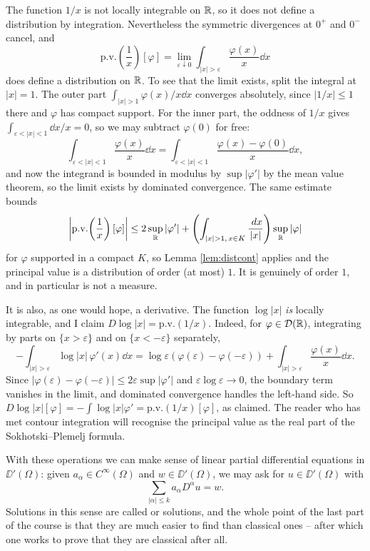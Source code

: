 \documentclass[a4paper]{scrartcl}
\begin{document}
\begin{example}\label{ex:pv}
	The function $1/x$ is not locally integrable on $\mathbb{R}$, so it does not define a distribution by integration. Nevertheless the symmetric divergences at $0^+$ and $0^-$ cancel, and
	$$\mathrm{p.v.}\!\left(\frac 1x\right)[\varphi]=\lim_{\varepsilon\downarrow0}\int_{|x|>\varepsilon}\frac{\varphi(x)}{x}\dd x$$
	does define a distribution on $\mathbb{R}$. To see that the limit exists, split the integral at $|x|=1$. The outer part $\int_{|x|>1}\varphi(x)/x\dd x$ converges absolutely, since $|1/x|\le1$ there and $\varphi$ has compact support. For the inner part, the oddness of $1/x$ gives $\int_{\varepsilon<|x|<1}\dd x/x = 0$, so we may subtract $\varphi(0)$ for free:
	$$\int_{\varepsilon<|x|<1}\frac{\varphi(x)}{x}\dd x = \int_{\varepsilon<|x|<1}\frac{\varphi(x)-\varphi(0)}{x}\dd x,$$
	and now the integrand is bounded in modulus by $\sup|\varphi'|$ by the mean value theorem, so the limit exists by dominated convergence. The same estimate bounds
	$$\left| \mathrm{p.v.}\!\left(\frac 1x\right)[\varphi]\right|\le 2\sup_\R|\varphi'| + \left(\int_{|x|>1, \, x \in K}\frac{\dd x}{|x|}\right)\sup_\R|\varphi|$$
	for $\varphi$ supported in a compact $K$, so Lemma \ref{lem:distcont} applies and the principal value is a distribution of order (at most) $1$. It is genuinely of order $1$, and in particular is not a measure.

	It is also, as one would hope, a derivative. The function $\log|x|$ \emph{is} locally integrable, and I claim $D\log|x| = \mathrm{p.v.}(1/x)$. Indeed, for $\varphi \in \mathcal{D}(\mathbb{R})$, integrating by parts on $\{x>\varepsilon\}$ and on $\{x<-\varepsilon\}$ separately,
	$$-\int_{|x|>\varepsilon}\log|x|\,\varphi'(x)\dd x = \log\varepsilon\left(\varphi(\varepsilon)-\varphi(-\varepsilon)\right)+\int_{|x|>\varepsilon}\frac{\varphi(x)}{x}\dd x.$$
	Since $|\varphi(\varepsilon)-\varphi(-\varepsilon)|\le2\varepsilon\sup|\varphi'|$ and $\varepsilon\log\varepsilon\to0$, the boundary term vanishes in the limit, and dominated convergence handles the left-hand side. So $D\log|x|[\varphi]=-\int\log|x|\varphi' = \mathrm{p.v.}(1/x)[\varphi]$, as claimed. The reader who has met contour integration will recognise the principal value as the real part of the Sokhotski--Plemelj formula.
\end{example}

With these operations we can make sense of linear partial differential equations in $\DD'(\Omega)$: given $a_\alpha \in C^\infty(\Omega)$ and $w \in \DD'(\Omega)$, we may ask for $u \in \DD'(\Omega)$ with
$$\sum_{|\alpha|\le k}a_\alpha D^\alpha u = w.$$
Solutions in this sense are called  or  solutions, and the whole point of the last part of the course is that they are much easier to find than classical ones -- after which one works to prove that they are classical after all.
\end{document}
